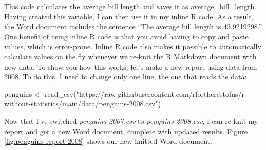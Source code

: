 \documentclass[
]{book}
\newenvironment{Shaded}{\begin{snugshade}}{\end{snugshade}}
\newcommand{\FunctionTok}[1]{\textcolor[rgb]{0.00,0.00,0.00}{#1}}
\newcommand{\NormalTok}[1]{#1}
\newcommand{\OtherTok}[1]{\textcolor[rgb]{0.56,0.35,0.01}{#1}}
\newcommand{\StringTok}[1]{\textcolor[rgb]{0.31,0.60,0.02}{#1}}
\begin{document}
This code calculates the average bill length and saves it as average\_bill\_length. Having created this variable, I can then use it in my inline R code. As a result, the Word document includes the sentence ``The average bill length is 43.9219298.''
One benefit of using inline R code is that you avoid having to copy and paste values, which is error-prone. Inline R code also makes it possible to automatically calculate values on the fly whenever we re-knit the R Markdown document with new data. To show you how this works, let's make a new report using data from 2008. To do this, I need to change only one line, the one that reads the data:

\begin{Shaded}
\begin{Highlighting}[]
\NormalTok{penguins }\OtherTok{\textless{}{-}} \FunctionTok{read\_csv}\NormalTok{(}\StringTok{"https://raw.githubusercontent.com/rfortherestofus/r{-}without{-}statistics/main/data/penguins{-}2008.csv"}\NormalTok{)}
\end{Highlighting}
\end{Shaded}

Now that I've switched \emph{penguins-2007.csv} to \emph{penguins-2008.csv}, I can re-knit my report and get a new Word document, complete with updated results. Figure \ref{fig:penguins-report-2008} shows our new knitted Word document.
\end{document}
